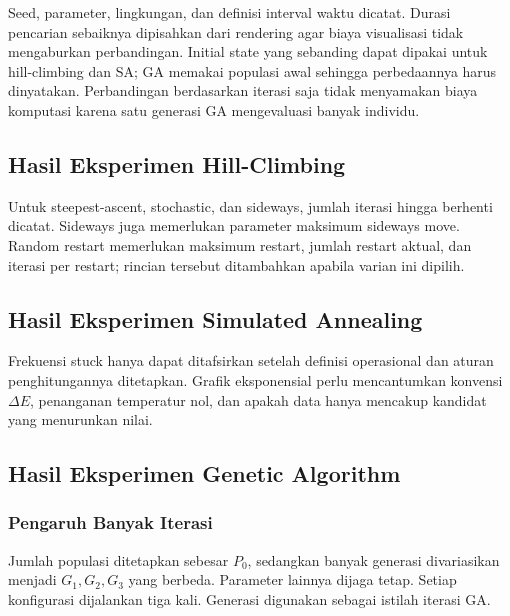 Seed, parameter, lingkungan, dan definisi interval waktu dicatat. Durasi
pencarian sebaiknya dipisahkan dari rendering agar biaya visualisasi tidak
mengaburkan perbandingan. Initial state yang sebanding dapat dipakai untuk
hill-climbing dan SA; GA memakai populasi awal sehingga perbedaannya harus
dinyatakan. Perbandingan berdasarkan iterasi saja tidak menyamakan biaya
komputasi karena satu generasi GA mengevaluasi banyak individu.


\subsection{Hasil Eksperimen Hill-Climbing}


Untuk steepest-ascent, stochastic, dan sideways, jumlah iterasi hingga berhenti
dicatat. Sideways juga memerlukan parameter maksimum sideways move. Random
restart memerlukan maksimum restart, jumlah restart aktual, dan iterasi
per restart; rincian tersebut ditambahkan apabila varian ini dipilih.



\subsection{Hasil Eksperimen Simulated Annealing}


Frekuensi stuck hanya dapat ditafsirkan setelah definisi operasional dan
aturan penghitungannya ditetapkan. Grafik eksponensial perlu mencantumkan
konvensi $\Delta E$, penanganan temperatur nol, dan apakah data hanya
mencakup kandidat yang menurunkan nilai.




\subsection{Hasil Eksperimen Genetic Algorithm}
\subsubsection{Pengaruh Banyak Iterasi}
Jumlah populasi ditetapkan sebesar $P_0$, sedangkan banyak generasi divariasikan
menjadi $G_1,G_2,G_3$ yang berbeda. Parameter lainnya dijaga tetap. Setiap
konfigurasi dijalankan tiga kali. Generasi digunakan sebagai istilah iterasi GA.

